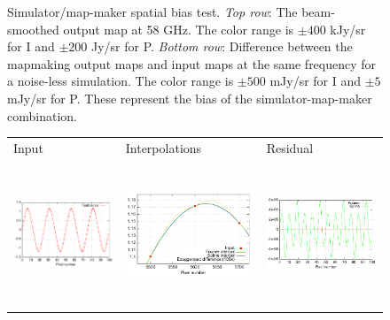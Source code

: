 \documentclass{article}
\begin{document}
\begin{figure}
\begin{tabular}{rm{56mm}m{54.4mm}m{56mm}}
	\end{tabular}
	\caption{Simulator/map-maker spatial bias test.
		\emph{Top row}: The beam-smoothed output map at 58 GHz.
			The color range is $\pm 400$ kJy/sr for I and $\pm 200$ Jy/sr for P.
		\emph{Bottom row}: Difference between the mapmaking output maps and
			input maps at the same frequency for a noise-less simulation.
			The color range is $\pm 500$ mJy/sr for I and $\pm 5$ mJy/sr for P.
			These represent the bias of the simulator-map-maker combination.}
	\label{fig:spatbias}
\end{figure}

\begin{figure}
	\centering
	\hspace*{-13mm}\begin{tabular}{m{59mm}m{59mm}m{59mm}}
		\hspace{30mm}Input & \hspace{20mm}Interpolations & \hspace{30mm}Residual \\
		\includegraphics[height=43mm,clip,trim=0 0 0 0]{plots/subpixel_model_input.pdf} &
		\includegraphics[height=43mm,clip,trim=0 0 0 0]{plots/subpixel_model_interpol.pdf} &
		\includegraphics[height=43mm,clip,trim=0 0 0 0]{plots/subpixel_model_residual.pdf}

\end{tabular}
\end{figure}
\end{document}
